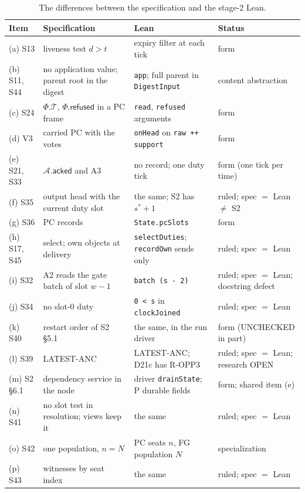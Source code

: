 \documentclass{article}
\newcommand{\T}{\mathcal T}
\newcommand{\AC}{\mathcal A}
\newcommand{\Fr}{\Phi}
\newcommand{\acked}{\mathsf{acked}}
\newcommand{\nm}[1]{\nolinkurl{#1}}
\begin{document}
\begin{table}[!ht]
\centering
\footnotesize
\caption{The differences between the specification and the stage-2 Lean.}\label{tab:diff}
\begin{tabular}{@{}l>{\raggedright\arraybackslash}p{4.0cm}>{\raggedright\arraybackslash}p{4.2cm}>{\raggedright\arraybackslash}p{2.4cm}@{}}
\hline
Item & Specification & Lean & Status\\
\hline
(a) S13 & liveness test $d>t$ & expiry filter at each tick & form\\
(b) S11, S44 & no application value; parent root in the digest & \nm{app}; full parent in \nm{DigestInput} & content abstraction\\
(c) S24 & $\Fr.\T$, $\Fr.\mathsf{refused}$ in a PC frame & \nm{read}, \nm{refused} arguments & form\\
(d) V3 & carried PC with the votes & \nm{onHead} on \nm{raw ++ support} & form\\
(e) S21, S33 & $\AC.\acked$ and A3 & no record; one duty tick & form (one tick per time)\\
(f) S35 & output head with the current duty slot & the same; S2 has $s^*+1$ & ruled; spec $=$ Lean $\neq$ S2\\
(g) S36 & 13 PC records & \nm{State.pcSlots} & form\\
(h) S17, S45 & select; own objects at delivery & \nm{selectDuties}; \nm{recordOwn} sends only & ruled; spec $=$ Lean\\
(i) S32 & A2 reads the gate batch of slot $w-1$ & \nm{batch (s - 2)} & ruled; spec $=$ Lean; docstring defect\\
(j) S34 & no slot-0 duty & \nm{0 < s} in \nm{clockJoined} & ruled; spec $=$ Lean\\
(k) S40 & restart order of S2 \S5.1 & the same, in the run driver & form (UNCHECKED in part)\\
(l) S39 & LATEST-ANC & LATEST-ANC; D21c has R-OPP3 & ruled; spec $=$ Lean; research OPEN\\
(m) S2 \S6.1 & dependency service in the node & driver \nm{drainState}; P durable fields & form; shared item (e)\\
(n) S41 & no slot test in resolution; views keep it & the same & ruled; spec $=$ Lean\\
(o) S42 & one population, $n=N$ & PC seats $n$, FG population $N$ & specialization\\
(p) S43 & witnesses by seat index & the same & ruled; spec $=$ Lean\\
\hline
\end{tabular}
\end{table}
\end{document}
